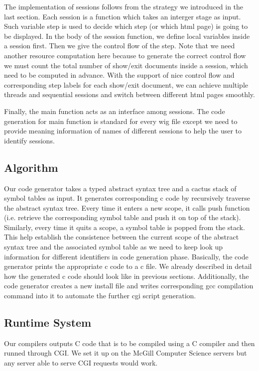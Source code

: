 \documentclass{WigReport}
\begin{document}
The implementation of sessions follows from the strategy we introduced in the last section. Each session is a function which takes an interger stage as input. Such variable step is used to decide which step (or which html page) is going to be displayed. In the body of the session function, we define local variables inside a session first. Then we give the control flow of the step. Note that we need another resource computation here because to generate the correct control flow we must count the total number of show/exit documents inside a session, which need to be computed in advance. With the support of nice control flow and corresponding step labels for each show/exit document, we can achieve multiple threads and sequential sessions and switch between different html pages smoothly.

Finally, the main function acts as an interface among sessions. The code generation for main function is standard for every wig file except we need to provide meaning information of names of different sessions to help the user to identify sessions.

\subsection{Algorithm}
Our code generator takes a typed abstract syntax tree and a cactus stack of symbol tables as input. It generates corresponding c code by recursively traverse the abstract syntax tree. Every time it enters a new scope, it calls push function (i.e. retrieve the corresponding symbol table and push it on top of the stack). Similarly, every time it quits a scope, a symbol table is popped from the stack. This help establish the consistence between the current scope of the abstract syntax tree and the associated symbol table as we need to keep look up information for different identifiers in code generation phase. Basically, the code generator prints the appropriate c code to a c file. We already described in detail how the generated c code should look like in previous sections. Additionally, the code generator creates a new install file and writes corresponding gcc compilation command into it to automate the further cgi script generation. 

\subsection{Runtime System}
Our compilers outputs C code that is to be compiled using a C compiler and then runned through CGI. We set it up on the McGill Computer Science servers but any server able to serve CGI requests would work.
\end{document}
